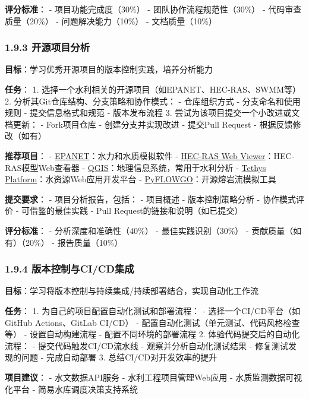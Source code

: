 \textbf{评分标准}： - 项目功能完成度（30\%） -
团队协作流程规范性（30\%） - 代码审查质量（20\%） - 问题解决能力（10\%）
- 文档质量（10\%）

\subsubsection{1.9.3
开源项目分析}\label{ux5f00ux6e90ux9879ux76eeux5206ux6790}

\textbf{目标}：学习优秀开源项目的版本控制实践，培养分析能力

\textbf{任务}： 1.
选择一个水利相关的开源项目（如EPANET、HEC-RAS、SWMM等） 2.
分析其Git仓库结构、分支策略和协作模式： - 仓库组织方式 -
分支命名和使用规则 - 提交信息格式和规范 - 版本发布流程 3.
尝试为该项目提交一个小改进或文档更新： - Fork项目仓库 -
创建分支并实现改进 - 提交Pull Request - 根据反馈修改（如有）

\textbf{推荐项目}： -
\href{https://github.com/USEPA/EPANET2.2}{EPANET}：水力和水质模拟软件 -
\href{https://github.com/HydrologicEngineeringCenter/HEC-RAS-Web-Viewer}{HEC-RAS
Web Viewer}：HEC-RAS模型Web查看器 -
\href{https://github.com/qgis/QGIS}{QGIS}：地理信息系统，常用于水利分析
- \href{https://github.com/tethysplatform/tethys}{Tethys
Platform}：水资源Web应用开发平台 -
\href{https://github.com/pyflowgo/pyflowgo}{PyFLOWGO}：开源熔岩流模拟工具

\textbf{提交要求}： - 项目分析报告，包括： - 项目概述 - 版本控制策略分析
- 协作模式评价 - 可借鉴的最佳实践 - Pull Request的链接和说明（如已提交）

\textbf{评分标准}： - 分析深度和准确性（40\%） - 最佳实践识别（30\%） -
贡献质量（如有）（20\%） - 报告质量（10\%）

\subsubsection{1.9.4
版本控制与CI/CD集成}\label{ux7248ux672cux63a7ux5236ux4e0ecicdux96c6ux6210}

\textbf{目标}：学习将版本控制与持续集成/持续部署结合，实现自动化工作流

\textbf{任务}： 1. 为自己的项目配置自动化测试和部署流程： -
选择一个CI/CD平台（如GitHub Actions、GitLab CI/CD） -
配置自动化测试（单元测试、代码风格检查等） - 设置自动构建流程 -
配置不同环境的部署流程 2. 体验代码提交后的自动化流程： -
提交代码触发CI/CD流水线 - 观察并分析自动化测试结果 - 修复测试发现的问题
- 完成自动部署 3. 总结CI/CD对开发效率的提升

\textbf{项目建议}： - 水文数据API服务 - 水利工程项目管理Web应用 -
水质监测数据可视化平台 - 简易水库调度决策支持系统

